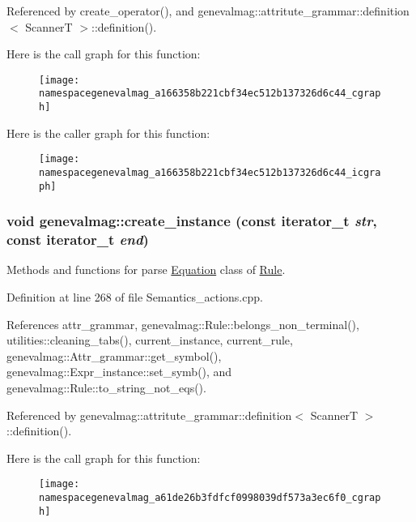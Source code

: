 Referenced by create\_\-operator(), and genevalmag::attritute\_\-grammar::definition$<$ ScannerT $>$::definition().



Here is the call graph for this function:\nopagebreak
\begin{figure}[H]
\begin{center}
\leavevmode
\texttt{[image: namespacegenevalmag\_a166358b221cbf34ec512b137326d6c44\_cgraph]}
\end{center}
\end{figure}




Here is the caller graph for this function:\nopagebreak
\begin{figure}[H]
\begin{center}
\leavevmode
\texttt{[image: namespacegenevalmag\_a166358b221cbf34ec512b137326d6c44\_icgraph]}
\end{center}
\end{figure}


\hypertarget{namespacegenevalmag_a61de26b3fdfcf0998039df573a3ec6f0}{
\subsubsection[{create\_\-instance}]{\setlength{\rightskip}{0pt plus 5cm}void genevalmag::create\_\-instance (const iterator\_\-t {\em str}, \/  const iterator\_\-t {\em end})}}
\label{namespacegenevalmag_a61de26b3fdfcf0998039df573a3ec6f0}
Methods and functions for parse \hyperlink{classgenevalmag_1_1Equation}{Equation} class of \hyperlink{classgenevalmag_1_1Rule}{Rule}. 

Definition at line 268 of file Semantics\_\-actions.cpp.



References attr\_\-grammar, genevalmag::Rule::belongs\_\-non\_\-terminal(), utilities::cleaning\_\-tabs(), current\_\-instance, current\_\-rule, genevalmag::Attr\_\-grammar::get\_\-symbol(), genevalmag::Expr\_\-instance::set\_\-symb(), and genevalmag::Rule::to\_\-string\_\-not\_\-eqs().



Referenced by genevalmag::attritute\_\-grammar::definition$<$ ScannerT $>$::definition().



Here is the call graph for this function:\nopagebreak
\begin{figure}[H]
\begin{center}
\leavevmode
\texttt{[image: namespacegenevalmag\_a61de26b3fdfcf0998039df573a3ec6f0\_cgraph]}
\end{center}
\end{figure}




